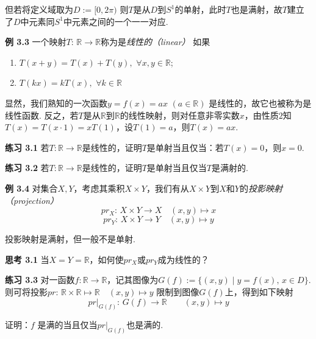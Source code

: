 \documentclass{article}
\begin{document}
但若将定义域取为$D:=[0,2\pi)$ 则$T$是从$D$到$S^{1}$的单射，此时$T$也是满射，故$T$建立了$D$中元素同$S^{1}$中元素之间的一个一一对应. 

\vspace{4pt}

\textbf{例 3.3} 一个映射$T:\,\mathbb{R}\longrightarrow \mathbb{R}$称为是\textit{线性的（linear）} 如果\begin{enumerate}
    \item $T(x+y)=T(x)+T(y),\,\,\forall x,y\in\mathbb{R}$;
    \item $T(kx)=kT(x),\,\,\forall k\in \mathbb{R}$
\end{enumerate}

显然，我们熟知的一次函数$y=f(x)=ax\,\,(a\in\mathbb{R})$ 是线性的，故它也被称为是线性函数. 反之，若$T$是从$\mathbb{R}$到$\mathbb{R}$的线性映射，则对任意非零实数$x$，由性质$2$知$T(x)=T(x\cdot 1)=xT(1)$，设$T(1)=a$，则$T
(x)=ax$.

\vspace{3pt}

\textbf{练习 3.1} 若$T:\mathbb{R}\to\mathbb{R}$是线性的，证明$T$是单射当且仅当：若$T(x)=0$，则$x=0$. 

\vspace{3pt}

\textbf{练习 3.2} 若$T:\mathbb{R}\to\mathbb{R}$是线性的，证明$T$是单射当且仅当$T$是满射的. 

\vspace{3pt}

\textbf{例 3.4} 对集合$X,Y$，考虑其乘积$X\times Y$，我们有从$X\times Y$到$X$和$Y$的\textit{投影映射（projection）}\[pr_{X}:\,X\times Y\longrightarrow X\quad (x,y)\longmapsto x\]\[pr_{Y}:\,X\times Y\longrightarrow Y\quad (x,y)\longmapsto y\]

投影映射是满射，但一般不是单射. 

\vspace{3pt}

\textbf{思考 3.1} 当$X=Y=\mathbb{R}$，如何使$pr_{X}$或$pr_{Y}$成为线性的？

\vspace{3pt}

\textbf{练习 3.3} 对一函数$f:\mathbb{R}\longrightarrow \mathbb{R}$，记其图像为$G(f):=\{(x,y)\mid y=f(x),\,x\in D\}$. 则可将投影$pr:\,\mathbb{R}\times \mathbb{R}\longmapsto\mathbb{R}\quad (x,y)\longmapsto y$ 限制到图像$G(f)$上，得到如下映射\[pr|_{G(f)}:\,G(f)\longrightarrow \mathbb{R}\qquad (x,y)\longmapsto y\]

证明：$f$ 是满的当且仅当$pr|_{G(f)}$也是满的.
\end{document}
